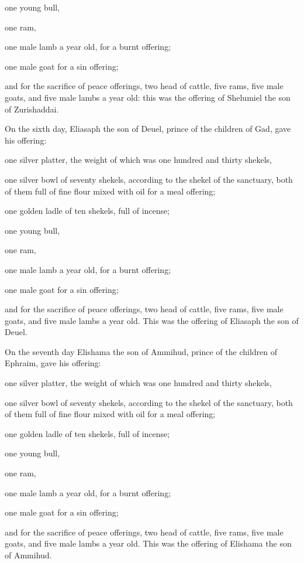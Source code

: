 one young bull,

one ram,

one male lamb a year old, for a burnt offering;

 one male goat for a sin offering;

 and for the sacrifice of peace offerings, two head of
cattle, five rams, five male goats, and five male lambs a year old: this
was the offering of Shelumiel the son of Zurishaddai.

 On the sixth day, Eliasaph the son of Deuel, prince of
the children of Gad,  gave his offering:

one silver platter, the weight of which was one hundred and thirty
shekels,

one silver bowl of seventy shekels, according to the shekel of the
sanctuary, both of them full of fine flour mixed with oil for a meal
offering;

 one golden ladle of ten shekels, full of incense;

 one young bull,

one ram,

one male lamb a year old, for a burnt offering;

 one male goat for a sin offering;

 and for the sacrifice of peace offerings, two head of
cattle, five rams, five male goats, and five male lambs a year old. This
was the offering of Eliasaph the son of Deuel.

 On the seventh day Elishama the son of Ammihud, prince
of the children of Ephraim,  gave his offering:

one silver platter, the weight of which was one hundred and thirty
shekels,

one silver bowl of seventy shekels, according to the shekel of the
sanctuary, both of them full of fine flour mixed with oil for a meal
offering;

 one golden ladle of ten shekels, full of incense;

 one young bull,

one ram,

one male lamb a year old, for a burnt offering;

 one male goat for a sin offering;

 and for the sacrifice of peace offerings, two head of
cattle, five rams, five male goats, and five male lambs a year old. This
was the offering of Elishama the son of Ammihud.

